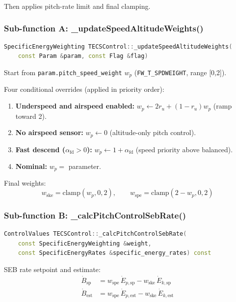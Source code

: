 \documentclass[12pt,a4paper]{article}
\begin{document}
Then applies pitch-rate limit and final clamping.

\subsubsection{Sub-function A: \_updateSpeedAltitudeWeights()}

\begin{lstlisting}[language=C++]
SpecificEnergyWeighting TECSControl::_updateSpeedAltitudeWeights(
    const Param &param, const Flag &flag)
\end{lstlisting}

Start from \texttt{param.pitch\_speed\_weight} $w_p$
(\texttt{FW\_T\_SPDWEIGHT}, range [0,2]).

Four conditional overrides (applied in priority order):
\begin{enumerate}
  \item \textbf{Underspeed and airspeed enabled:}
        $w_p \leftarrow 2r_u + (1-r_u)w_p$ (ramp toward 2).
  \item \textbf{No airspeed sensor:} $w_p \leftarrow 0$
        (altitude-only pitch control).
  \item \textbf{Fast descend ($\alpha_{\text{fd}} > 0$):}
        $w_p \leftarrow 1 + \alpha_{\text{fd}}$ (speed priority above balanced).
  \item \textbf{Nominal:} $w_p = $ parameter.
\end{enumerate}

Final weights:
\begin{equation}
  w_{\text{ske}} = \text{clamp}(w_p, 0, 2), \qquad
  w_{\text{spe}} = \text{clamp}(2 - w_p, 0, 2)
\end{equation}

\subsubsection{Sub-function B: \_calcPitchControlSebRate()}

\begin{lstlisting}[language=C++]
ControlValues TECSControl::_calcPitchControlSebRate(
    const SpecificEnergyWeighting &weight,
    const SpecificEnergyRates &specific_energy_rates) const
\end{lstlisting}

SEB rate setpoint and estimate:
\begin{align}
  \dot{B}_{\text{sp}}  &= w_{\text{spe}}\,\dot{E}_{p,\text{sp}} - w_{\text{ske}}\,\dot{E}_{k,\text{sp}} \\
  \dot{B}_{\text{est}} &= w_{\text{spe}}\,\dot{E}_{p,\text{est}} - w_{\text{ske}}\,\dot{E}_{k,\text{est}}
\end{align}
\end{document}
